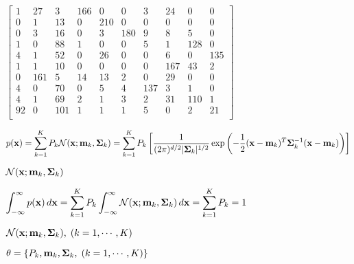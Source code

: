 \documentclass{article}
\def\lthtmlcheckvsize{\ifdim\ht\sizebox<\vsize 
  \ifdim\wd\sizebox<\hsize\expandafter\hfill\fi \expandafter\vfill
  \else\expandafter\vss\fi}%
\begin{document}
{\newpage\clearpage
{}%
$\displaystyle \left[ \begin{array}{rrrrrrrrrr}
1 &  27 &   3 & 166 &   0 &   0 &   3 &  24 &   0 &   0 \\
0 &   1 &  13 &   0 & 210 &   0 &   0 &   0 &   0 &   0 \\
0 &   3 &  16 &   0 &   3 & 180 &   9 &   8 &   5 &   0 \\
1 &   0 &  88 &   1 &   0 &   0 &   5 &   1 & 128 &   0 \\
4 &   1 &  52 &   0 &  26 &   0 &   0 &   6 &   0 & 135 \\
1 &   1 &  10 &   0 &   0 &   0 &   0 & 167 &  43 &   2 \\
0 & 161 &   5 &  14 &  13 &   2 &   0 &  29 &   0 &   0 \\
4 &   0 &  70 &   0 &   5 &   4 & 137 &   3 &   1 &   0 \\
4 &   1 &  69 &   2 &   1 &   3 &   2 &  31 & 110 &   1 \\
92 &   0 & 101 &   1 &   1 &   1 &   5 &   0 &   2 &  21 \\
\end{array}\right]$%
\lthtmlindisplaymathZ
\lthtmlcheckvsize\clearpage}

{\newpage\clearpage
{}%
$\displaystyle p({\bf x})=\sum_{k=1}^K P_k {\cal N}({\bf x}; {\bf m}_k,{\bf\Sigma}_k)
=\sum_{k=1}^K P_k \left[
\frac{1}{(2\pi)^{d/2}|{\bf\Sigma}_k|^{1/2}}
\exp\left(-\frac{1}{2}({\bf x}-{\bf m}_k)^T
{\bf\Sigma}_k^{-1}({\bf x}-{\bf m}_k)\right)\right]$%
\lthtmlindisplaymathZ
\lthtmlcheckvsize\clearpage}

{\newpage\clearpage
{}%
$ {\cal N}({\bf x}; {\bf m}_k,{\bf\Sigma}_k)$%
\lthtmlindisplaymathZ
\lthtmlcheckvsize\clearpage}

{\newpage\clearpage
{}%
$\displaystyle \int_{-\infty}^\infty p({\bf x})\,d{\bf x}
=\sum_{k=1}^K P_k \int_{-\infty}^\infty
{\cal N}({\bf x}; {\bf m}_k,{\bf\Sigma}_k)\,d{\bf x}
=\sum_{k=1}^K P_k =1$%
\lthtmlindisplaymathZ
\lthtmlcheckvsize\clearpage}

{\newpage\clearpage
{}%
$ {\cal N}({\bf x}; {\bf m}_k,{\bf\Sigma}_k),\;(k=1,\cdots,K)$%
\lthtmlindisplaymathZ
\lthtmlcheckvsize\clearpage}

{\newpage\clearpage
{}%
$ \theta =\{P_k,{\bf m}_k,{\bf\Sigma}_k,\;(k=1,\cdots,K)\}$%
\lthtmlindisplaymathZ
\lthtmlcheckvsize\clearpage}
\end{document}
